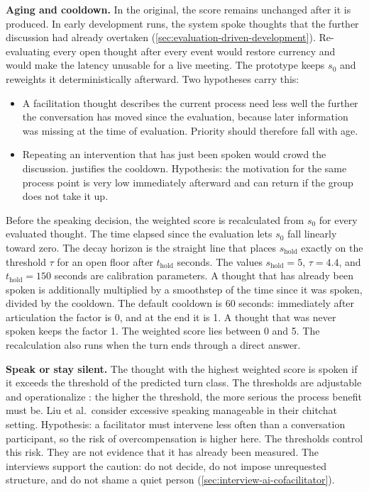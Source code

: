 \label{sec:dynamic-im}
\textbf{Aging and cooldown.}
In the original, the score remains unchanged after it is produced.
In early development runs, the system spoke thoughts that the further discussion had already overtaken
(\autoref{sec:evaluation-driven-development}).
Re-evaluating every open thought after every event would restore currency
and would make the latency unusable for a live meeting.
The prototype keeps \(s_0\) and reweights it deterministically afterward.
Two hypotheses carry this:
\begin{itemize}
  \item A facilitation thought describes the current process need less well the further the conversation
    has moved since the evaluation, because later information was missing at the time of evaluation.
    Priority should therefore fall with age.
  \item Repeating an intervention that has just been spoken would crowd the discussion.
     justifies the cooldown.
    Hypothesis: the motivation for the same process point is very low immediately afterward and can
    return if the group does not take it up.
\end{itemize}
Before the speaking decision, the weighted score is recalculated from \(s_0\) for every evaluated thought.
The time elapsed since the evaluation lets \(s_0\) fall linearly toward zero.
The decay horizon is the straight line that places \(s_{\text{hold}}\) exactly on the
threshold \(\tau\) for an open floor after \(t_{\text{hold}}\) seconds.
The values \(s_{\text{hold}} = 5\), \(\tau = 4.4\), and \(t_{\text{hold}} = 150\) seconds are
calibration parameters.
A thought that has already been spoken is additionally multiplied by a smoothstep of the time since it was
spoken, divided by the cooldown.
The default cooldown is 60 seconds: immediately after articulation the factor is 0, and at the end it is 1.
A thought that was never spoken keeps the factor 1.
The weighted score lies between 0 and 5.
The recalculation also runs when the turn ends through a direct answer.

\textbf{Speak or stay silent.}
The thought with the highest weighted score is spoken if it exceeds the threshold of the
predicted turn class.
The thresholds are adjustable and operationalize : the higher the threshold,
the more serious the process benefit must be.
Liu et al.\ consider excessive speaking manageable in their chitchat setting.
Hypothesis: a facilitator must intervene less often than a conversation participant, so the risk of
overcompensation is higher here.
The thresholds control this risk.
They are not evidence that it has already been measured.
The interviews support the caution: do not decide, do not impose unrequested structure, and do not shame a
quiet person
(\autoref{sec:interview-ai-cofacilitator}).

